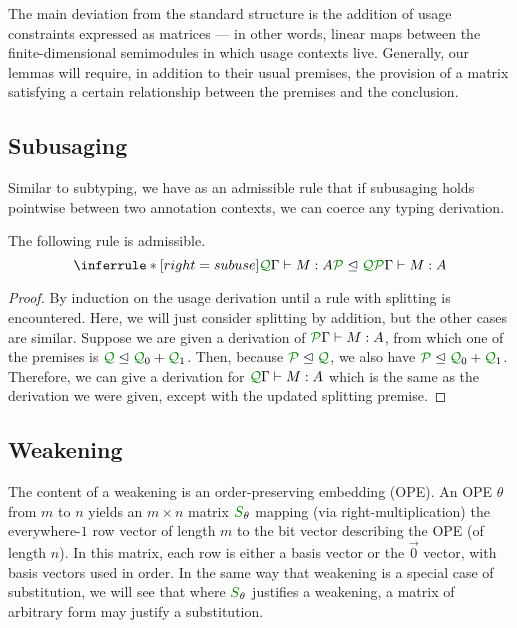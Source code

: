 \documentclass[acmsmall,review]{acmart}
\begin{document}
The main deviation from the standard structure is the addition of usage
constraints expressed as matrices --- in other words, linear maps between the
finite-dimensional semimodules in which usage contexts live.
Generally, our lemmas will require, in addition to their usual premises, the
provision of a matrix satisfying a certain relationship between the premises and
the conclusion.

\subsection{Subusaging}

Similar to subtyping, we have as an admissible rule that if subusaging holds
pointwise between two annotation contexts, we can coerce any typing derivation.

\begin{lemma}\label{lem:subuse}
  The following rule is admissible.
  \[
    \inferrule*[right=subuse]{
      \ctx{\Gamma}{Q} \vdash M : A
      \\ \resctx P \subres \resctx Q
    }
    {
      \ctx{\Gamma}{P} \vdash M : A
    }
  \]
\end{lemma}
\begin{proof}
  By induction on the usage derivation until a rule with splitting is
  encountered.
  Here, we will just consider splitting by addition, but the other cases are
  similar.
  Suppose we are given a derivation of $\ctx{\Gamma}{P} \vdash M : A$,
  from which one of the premises is
  $\resctx Q \subres \resctx Q_0 + \resctx Q_1$.
  Then, because $\resctx P \subres \resctx Q$, we also have
  $\resctx P \subres \resctx Q_0 + \resctx Q_1$.
  Therefore, we can give a derivation for
  $\ctx{\Gamma}{Q} \vdash M : A$ which is the same as the derivation we
  were given, except with the updated splitting premise.
\end{proof}

\subsection{Weakening}

The content of a weakening is an order-preserving embedding (OPE).
An OPE $\theta$ from $m$ to $n$ yields an $m \times n$ matrix $\resmat S_\theta$
mapping (via right-multiplication) the everywhere-$1$ row vector of length $m$
to the bit vector describing the OPE (of length $n$).
In this matrix, each row is either a basis vector or the $\vec 0$ vector, with
basis vectors used in order.
In the same way that weakening is a special case of substitution, we will see
that where $\resmat S_\theta$ justifies a weakening, a matrix of arbitrary form
may justify a substitution.
\end{document}
